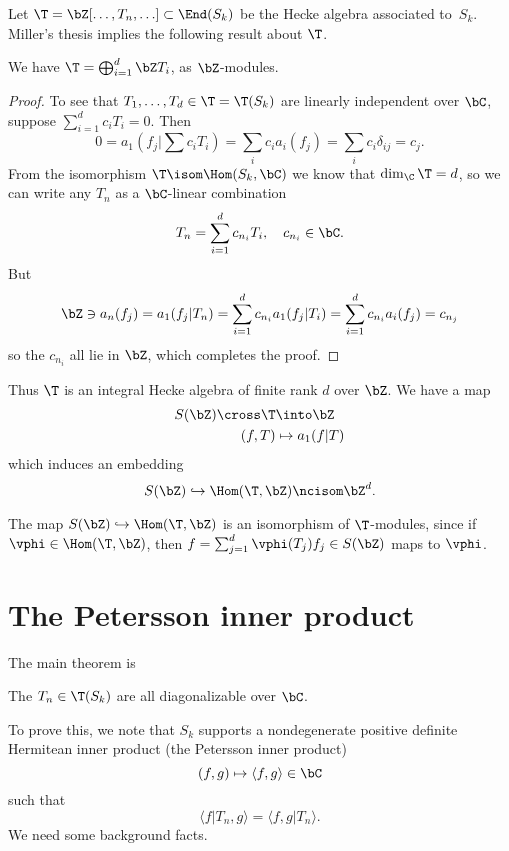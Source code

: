 \documentclass{report}
\begin{document}
Let $\T=\bZ[\ldots,T_n,\ldots]\subset \End(S_k)$ be
the Hecke algebra associated to~$S_k$.
Miller's thesis implies the following result about $\T$.
\begin{proposition}
We have $\T=\bigoplus_{i=1}^{d} \bZ T_i$, as $\bZ$-modules.
\end{proposition}

\begin{proof}
To see that $T_1,\ldots,T_d\in \T=\T(S_k)$
are linearly independent over $\bC$, suppose
$\sum_{i=1}^{d} c_i T_i = 0$.
Then
$$0=a_1\left(f_j|\sum c_i T_i\right)=\sum_{i}c_i a_i(f_j) =
\sum_{i} c_i \delta_{ij} = c_j.$$ From the isomorphism
$\T\isom\Hom(S_k,\bC)$ we know that $\dim_{\C}\T=d$,
so we can write any $T_n$ as a $\bC$-linear combination
$$T_n=\sum_{i=1}^{d}c_{n_i}T_i,\quad c_{n_i}\in\bC.$$
But
$$\bZ\ni a_n(f_j)=a_1(f_j|T_n)=\sum_{i=1}^{d}c_{n_i}a_1(f_j|T_i)
=\sum_{i=1}^{d}c_{n_i}a_i(f_j) = c_{n_j}$$
so the $c_{n_i}$ all lie in $\bZ$, which completes the proof.
\end{proof}

Thus $\T$ is an integral Hecke algebra of finite rank $d$ over $\bZ$.
We have a map
\begin{align*}
S(\bZ)\cross \T & \into \bZ \\
(f,T) & \mapsto a_1(f|T)
\end{align*}
which induces an embedding
$$S(\bZ)\hookrightarrow\Hom(\T,\bZ)\ncisom \bZ^d.$$

\begin{remark}
The map $S(\bZ)\hookrightarrow\Hom(\T,\bZ)$ is
an isomorphism of $\T$-modules, since
if $\vphi\in\Hom(\T,\bZ)$,
then $f=\sum_{j=1}^d \vphi(T_j) f_j\in S(\bZ)$ maps to $\vphi$.
\end{remark}

\section{The Petersson inner product}\label{sec:petersson}

The main theorem is
\begin{theorem}
The $T_n\in\T(S_k)$ are all diagonalizable over $\bC$.
\end{theorem}

To prove this, we note that $S_k$ supports a nondegenerate positive definite
Hermitean inner product (the Petersson inner product)
$$(f,g)\mapsto\langle f,g\rangle\in\bC$$
such that
\begin{equation}\label{eqn:Tnhermitean}
\langle f|T_n,g\rangle =\langle f,g|T_n\rangle.
\end{equation}
We need some background facts.
\end{document}
